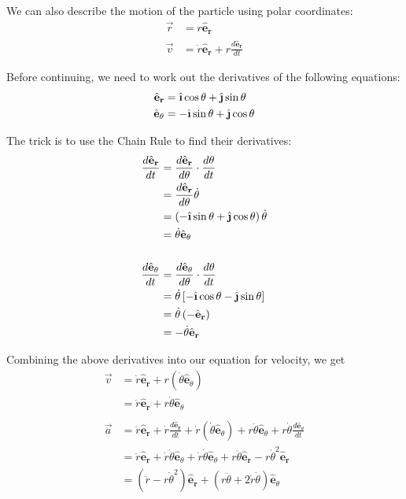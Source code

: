 \documentclass{article}
\newcommand{\ihat}{\hat{\textbf{\i}}}
\newcommand{\jhat}{\hat{\textbf{\j}}}
\newcommand{\erhat}{\hat{\textbf{e}}_\textbf{r}}
\newcommand{\ethat}{\hat{\textbf{e}}_\textbf{$\theta$}}
\begin{document}
 

We can also describe the motion of the particle using polar coordinates:
\begin{align*}
    \vec{r} &= r\erhat \\
    \vec{v} &= \dot{r}\erhat + r \frac{d\erhat}{dt}
\end{align*}

Before continuing, we need to work out the derivatives of the following equations:
\begin{align*}
    \erhat &= \ihat \cos\theta + \jhat \sin\theta \\
    \ethat &= -\ihat \sin\theta + \jhat \cos\theta
\end{align*}

The trick is to use the Chain Rule to find their derivatives:
\begin{align*}
    \frac{d\erhat}{dt} &= \frac{d\erhat}{d\theta} \cdot \frac{d\theta}{dt} \\
                       &= \frac{d\erhat}{d\theta} \dot{\theta} \\
                       &= \left( -\ihat\sin\theta + \jhat\cos\theta \right) \dot{\theta} \\
                       &= \dot{\theta} \ethat \\ \\
    \frac{d\ethat}{dt} &= \frac{d\ethat}{d\theta} \cdot \frac{d\theta}{dt} \\
                       &= \dot{\theta} \left[ -\ihat\cos\theta -\jhat\sin\theta \right] \\
                       &= \dot{\theta} \left( -\erhat \right) \\
                       &= -\dot{\theta} \erhat
\end{align*}

Combining the above derivatives into our equation for velocity, we get
\begin{align*}
    \vec{v} &= \dot{r} \erhat + r \left( \dot{\theta} \ethat \right) \\
            &= \dot{r} \erhat + r \dot{\theta} \ethat \\ \\
    \vec{a} &= \ddot{r} \erhat + \dot{r} \frac{d\erhat}{dt} + \dot{r} \left( \dot{\theta} \ethat \right) + r \ddot{\theta} \ethat + r \dot{\theta} \frac{d\ethat}{dt} \\
            &= \ddot{r} \erhat + \dot{r} \dot{\theta} \ethat + \dot{r} \dot{\theta} \ethat + r \ddot{\theta} \erhat - r \dot{\theta}^2 \erhat \\
            &= \left( \ddot{r} - r \dot{\theta}^2 \right) \erhat + \left( r \ddot{\theta} + 2\dot{r}\dot{\theta} \right) \ethat
\end{align*}
\end{document}
